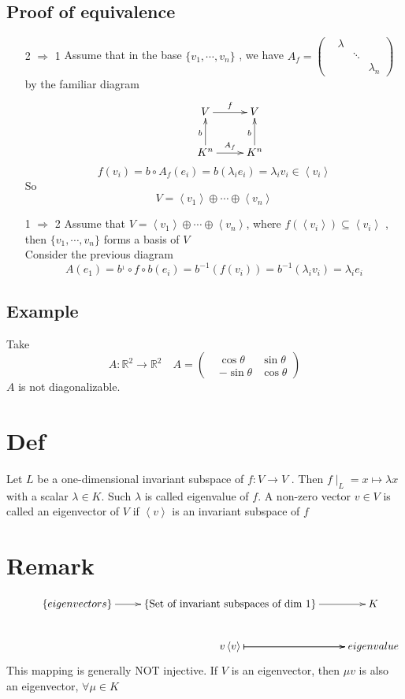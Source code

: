 \documentclass{book}
\begin{document}
\subsection*{Proof of equivalence}
\begin{itemize}
    \item [2 $\Rightarrow$ 1]Assume that in the base $\{v_1,\cdots,v_n\}$ , we have $A_f=\left(\begin{aligned}
        &\lambda&&\\ &&\ddots&\\ &&&\lambda_n\end{aligned}\right)$ by the familiar diagram
        $$\xymatrix{&V\ar[r]^f &V\\ &K^n\ar[u]^b\ar[r]^{A_f} &K^n\ar[u]^b}$$$$f(v_i)=b\circ A_f(e_i)=b(\lambda_ie_i)=\lambda_iv_i\in\left<v_i\right>$$
        So $$V=\left<v_1\right>\oplus\cdots\oplus\left<v_n\right>$$
    \item [1 $\Rightarrow$ 2]Assume that $V=\left<v_1\right>\oplus\cdots\oplus\left<v_n\right>$, where $f(\left<v_i\right>)\subseteq\left<v_i\right>$
    , then $\{v_1,\cdots,v_n\}$ forms a basis of $V$\\
    Consider the previous diagram
    $$A(e_1)=b^{_1}\circ f\circ b(e_i)=b^{-1}(f(v_i))=b^{-1}(\lambda_iv_i)=\lambda_ie_i$$
\end{itemize}
\subsection{Example}
Take $$A:\mathbb{R}^2\rightarrow\mathbb{R}^2\quad A=\left(\begin{aligned}&\cos\theta &\sin\theta\\ &-\sin\theta&\cos\theta\end{aligned}\right)$$ $A$ is not diagonalizable.
\section{Def}
Let $L$ be a one-dimensional invariant subspace of $f:V\rightarrow V$ . Then $f\mid_L=x\mapsto\lambda x$ with a scalar $\lambda\in K$. Such $\lambda$ is called eigenvalue of $f$. A non-zero vector $v\in V$ is called an eigenvector of $V$ if $\left<v\right>$ is an invariant subspace of $f$
\section{Remark}
$$\xymatrix{ &\{eigenvectors\}\ar[r]&\{\text{Set of invariant subspaces of dim 1}\}\ar[r] &K\\
&&v\ar@{|->}[r]\left<v\right>\ar@{|->}[r]&eigenvalue
}$$
This mapping is generally NOT injective. If $V$ is an eigenvector, then $\mu v$ is also an eigenvector, $\forall \mu\in K$
\end{document}
